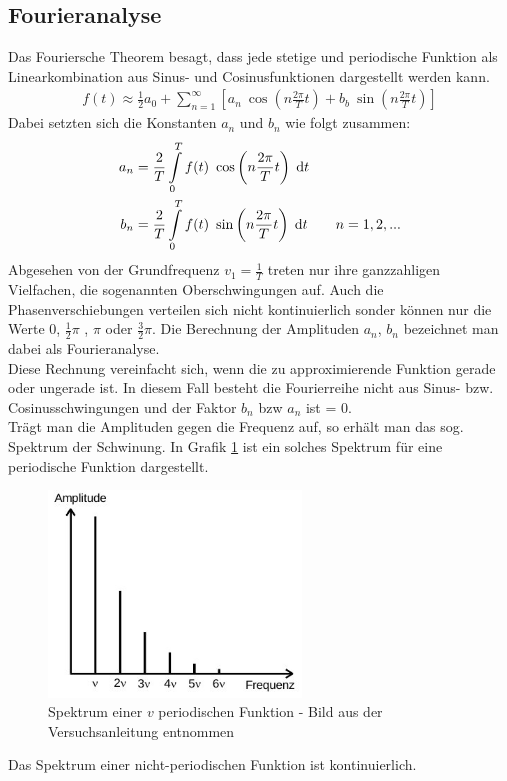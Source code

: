 \subsection{Fourieranalyse}
Das Fouriersche Theorem besagt, dass jede stetige und periodische Funktion als Linearkombination aus Sinus- und Cosinusfunktionen dargestellt werden kann. 
\begin{align}
f(t)\approx \frac{1}{2} a_0 + \sum^\infty_{n=1} \left[ a_n~\cos\left(n\frac{2\pi}{T}t\right)+ b_b~ \sin\left(n\frac{2\pi}{T}t\right)\right]
\label{eq_fanalyse}
\end{align}
Dabei setzten sich die Konstanten $a_n$ und $b_n$ wie folgt zusammen:
\begin{align}
 a_n&=\frac{2}{T}\int\limits_{0}^T f(t)~\cos\left(n\frac{2\pi}{T}t\right) \; \mathrm{d} t\\
 b_n&=\frac{2}{T}\int\limits_{0}^T f(t)~\sin\left(n\frac{2\pi}{T}t\right) \; \mathrm{d} t\qquad n=1,2,...
\end{align}
Abgesehen von der Grundfrequenz $v_1 =\frac{1}{T}$ treten nur ihre ganzzahligen Vielfachen, die sogenannten Oberschwingungen auf. Auch die Phasenverschiebungen verteilen sich nicht kontinuierlich sonder können nur die Werte 0, $\frac{1}{2}\pi$ , $\pi$ oder $\frac{3}{2}\pi$. Die Berechnung der Amplituden $a_n$, $b_n$ bezeichnet man dabei als Fourieranalyse.\\
Diese Rechnung vereinfacht sich, wenn die zu approximierende Funktion gerade oder ungerade ist. In diesem Fall besteht die Fourierreihe nicht aus Sinus- bzw. Cosinusschwingungen und der Faktor $b_n$ bzw $a_n$ ist = 0.\\
Trägt man die Amplituden gegen die Frequenz auf, so erhält man das sog. Spektrum der Schwinung. In Grafik \ref{pic_spec} ist ein solches Spektrum für eine periodische Funktion dargestellt. 
\begin{figure}[htbp]
\includegraphics[width=0.6\textwidth]{pics/amplitude_frequenz.jpeg}
\caption{Spektrum einer $v$ periodischen Funktion - Bild aus der Versuchsanleitung entnommen}
\label{pic_spec}
\end{figure} Das Spektrum einer nicht-periodischen Funktion ist kontinuierlich.\\

